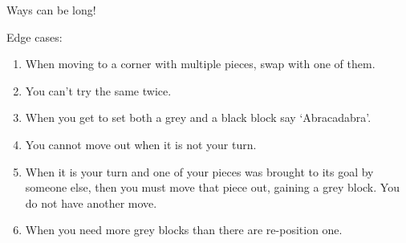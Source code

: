     Ways can be long!
    
    

  

    \skipper

\raggedright

\vspace{5ex}

Edge cases:

    \begin{enumerate}
        \item When moving to a corner with multiple pieces, swap with one of them.
        \item You can't try the same twice.
        \item When you get to set both a grey and a black block say `Abracadabra'.
        \item You cannot move out when it is not your turn.
        \item When it is your turn and one of your pieces was brought to its goal by someone else, then you must move that piece out, gaining a grey block. You do not have another move.
        \item When you need more grey blocks than there are re-position one.
    \end{enumerate}

\hrulefill






